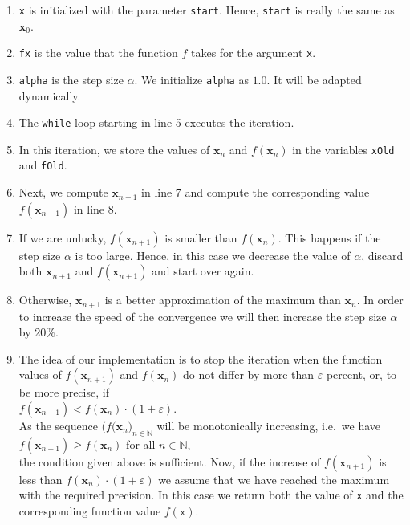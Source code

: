 \begin{enumerate}
\item \texttt{x} is initialized with the parameter \texttt{start}.  Hence, \texttt{start} is really the same as
      $\mathbf{x}_0$. 
\item \texttt{fx} is the value that the function $f$ takes for the argument \texttt{x}.
\item \texttt{alpha} is the step size $\alpha$.  We initialize \texttt{alpha} as $1.0$.  It will be adapted
      dynamically. 
\item The \texttt{while} loop starting in line 5 executes the iteration.
\item In this iteration, we store the values of $\mathbf{x}_n$ and $f(\mathbf{x}_n)$ in the variables
      \texttt{xOld} and \texttt{fOld}.
\item Next, we compute $\mathbf{x}_{n+1}$ in line 7 and compute the corresponding value $f(\mathbf{x}_{n+1})$ in line 8.
\item If we are unlucky, $f(\mathbf{x}_{n+1})$ is smaller than $f(\mathbf{x}_{n})$.  This happens if the step
      size $\alpha$ is too large.  Hence, in this case we decrease the value of $\alpha$, discard 
      both $\mathbf{x}_{n+1}$ and $f(\mathbf{x}_{n+1})$ and start over again.
\item Otherwise, $\mathbf{x}_{n+1}$ is a better approximation of the maximum than $\mathbf{x}_n$.  
      In order to increase the speed of the convergence we will then increase the step size $\alpha$ by $20\%$.   
\item The idea of our implementation is to stop the iteration when the function values of 
      $f(\mathbf{x}_{n+1})$ and $f(\mathbf{x}_{n})$ do not differ by more than $\varepsilon$ percent, or, to be more
      precise, if
      \\[0.2cm]
      \hspace*{1.3cm}
      $f(\mathbf{x}_{n+1}) < f(\mathbf{x}_{n}) \cdot (1 + \varepsilon)$.
      \\[0.2cm]
      As the sequence $\bigl(f(\mathbf{x}_n\bigr)_{n\in\mathbb{N}}$ will be monotonically
      increasing, i.e.~we have
      \\[0.2cm]
      \hspace*{1.3cm}
      $f(\mathbf{x}_{n+1}) \geq f(\mathbf{x}_{n})$ \quad for all $n\in\mathbb{N}$,
      \\[0.2cm]
      the condition given above is sufficient.  Now, if the increase of  $f(\mathbf{x}_{n+1})$ is less than $f(\mathbf{x}_{n}) \cdot (1 + \varepsilon)$ 
      we assume that we have reached the maximum with the required precision.  In this case we return both the
      value of \texttt{x} and the corresponding function value $f(\mathtt{x})$.
\end{enumerate}
